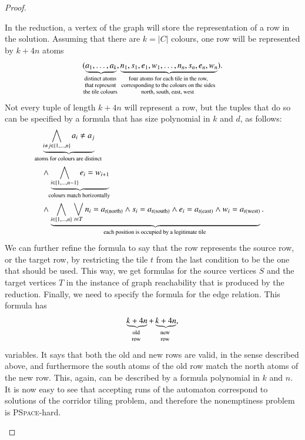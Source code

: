 \begin{proof}
\begin{itemize}
    In the reduction, a vertex  of the graph will store the representation of  a row in the solution.
    Assuming that there are $k=|C|$ colours, one row will be represented by  $k + 4n$ atoms
\begin{align*}
(\myunderbrace{a_1,\ldots,a_k}{distinct atoms \\ that represent \\ the tile colours}, \myunderbrace{n_1,s_1,e_1,w_1, \ldots, n_n,s_n,e_n,w_n}{four atoms for each tile in the row,\\ corresponding to the colours on the sides \\ north, south, east, west }).
\end{align*}
Not every tuple of length $k  +4n$ will represent a row, but the tuples that do so can be specified by a formula that has size polynomial in $k$ and $d$, as follows: 
\begin{align*}
& \myunderbrace{\bigwedge_{i \neq j \in \set{1,\ldots,n}} a_i \neq a_j}{atoms for colours are distinct}  \\
& \land \myunderbrace{\bigwedge_{i \in \set{1,\ldots,n-1}} e_i = w_{i+1}}{colours match horizontally}\\
& \land \myunderbrace{\bigwedge_{i \in \set{1,\ldots,n}} \bigvee_{t \in T} n_i = a_{t(\text{north})} \land s_i = a_{t(\text{south})} \land e_i = a_{t(\text{east})} \land w_i = a_{t(\text{west})}}{each position is occupied by a legitimate tile}.
\end{align*}
 We can further refine the formula to say that the row represents the source row, or the target row, by restricting the tile $t$ from the last condition to be the one that should be used. This way, we get formulas for the source vertices $S$ and the target vertices $T$ in the instance of graph reachability that is produced by the reduction.  Finally, we need to specify the formula for the edge relation. This formula has 
\begin{align*}
\myunderbrace{k+4n}{old \\ row} + 
\myunderbrace{k+4n}{new \\ row},
\end{align*}
variables. It says that both the old and new rows are valid, in the sense described above, and furthermore the south atoms of the old row match the north atoms of the new row. This, again, can be described by a formula polynomial in $k$ and $n$. It is now easy to see that accepting runs of the automaton correspond to solutions of the corridor tiling problem, and therefore the nonemptiness problem is \textsc{PSpace}-hard.
\end{itemize}
\end{proof}

\exercisepart

